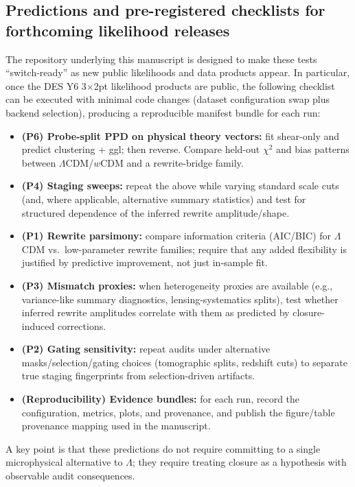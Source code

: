 \documentclass[11pt]{article}
\theoremstyle{definition}
\theoremstyle{plain}
\theoremstyle{remark}
\begin{document}
\subsection{Predictions and pre-registered checklists for forthcoming likelihood releases}\label{sec:discussion:predictions}
The repository underlying this manuscript is designed to make these tests ``switch-ready'' as new public likelihoods and data products appear. In particular, once the DES Y6 3$\times$2pt likelihood products are public, the following checklist can be executed with minimal code changes (dataset configuration swap plus backend selection), producing a reproducible manifest bundle for each run:

\begin{itemize}
  \item \textbf{(P6) Probe-split PPD on physical theory vectors:} fit shear-only and predict clustering + ggl; then reverse. Compare held-out $\chi^2$ and bias patterns between $\Lambda$CDM/$w$CDM and a rewrite-bridge family.
  \item \textbf{(P4) Staging sweeps:} repeat the above while varying standard scale cuts (and, where applicable, alternative summary statistics) and test for structured dependence of the inferred rewrite amplitude/shape.
  \item \textbf{(P1) Rewrite parsimony:} compare information criteria (AIC/BIC) for $\Lambda$CDM vs.\ low-parameter rewrite families; require that any added flexibility is justified by predictive improvement, not just in-sample fit.
  \item \textbf{(P3) Mismatch proxies:} when heterogeneity proxies are available (e.g., variance-like summary diagnostics, lensing-systematics splits), test whether inferred rewrite amplitudes correlate with them as predicted by closure-induced corrections.
  \item \textbf{(P2) Gating sensitivity:} repeat audits under alternative masks/selection/gating choices (tomographic splits, redshift cuts) to separate true staging fingerprints from selection-driven artifacts.
  \item \textbf{(Reproducibility) Evidence bundles:} for each run, record the configuration, metrics, plots, and provenance, and publish the figure/table provenance mapping used in the manuscript.
\end{itemize}

A key point is that these predictions do not require committing to a single microphysical alternative to $\Lambda$; they require treating closure as a hypothesis with observable audit consequences.
\end{document}
